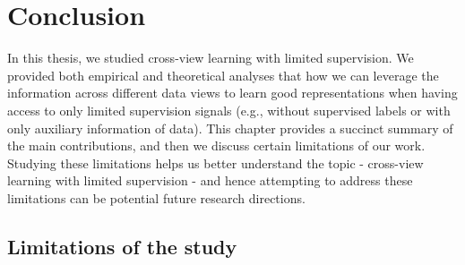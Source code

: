 \section{Conclusion}

In this thesis, we studied cross-view learning with limited supervision. We provided both empirical
and theoretical analyses that how we can leverage the information across different data views to learn
good representations when having access to only limited supervision signals (e.g., without supervised
labels or with only auxiliary information of data). This chapter provides a succinct summary of the main
contributions, and then we discuss certain limitations of our work. Studying these limitations helps us
better understand the topic - cross-view learning with limited supervision - and hence attempting to address
these limitations can be potential future research directions.



\subsection{Limitations of the study}

